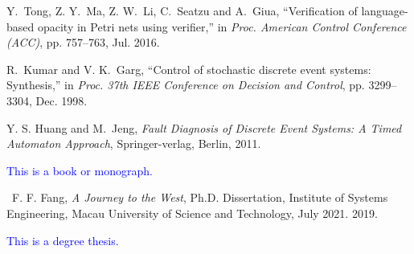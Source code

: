 \documentclass{article}
\begin{document}
\begin{thebibliography}{10}
		
		Y.~Tong, Z. Y.~Ma, Z. W.~Li, C.~Seatzu and A.~Giua, ``Verification of language-based
		opacity in Petri nets using verifier,'' in \emph{Proc. American Control Conference (ACC)}, pp. 757--763, Jul. 2016.
		
	
		
		
		R.~Kumar and V. K.~Garg, ``Control of stochastic discrete event systems: Synthesis,'' in \emph{Proc. 37th IEEE Conference on Decision and Control}, pp. 3299--3304, Dec. 1998.
		
		Y. S. Huang and M.~Jeng, \emph{Fault Diagnosis of Discrete Event Systems: A Timed Automaton Approach}, Springer-verlag, Berlin, 2011.
		
		\begin{framed}	
		\textcolor{blue}{This is a book or monograph.  }
		\end{framed}

~F. F. Fang, \emph{A Journey to the West}, Ph.D. Dissertation, Institute of Systems Engineering, Macau University of Science and Technology, July 2021.
2019.

\begin{framed}	
		\textcolor{blue}{This is a degree thesis.  }
		\end{framed}

  
  
\end{thebibliography}
\end{document}
